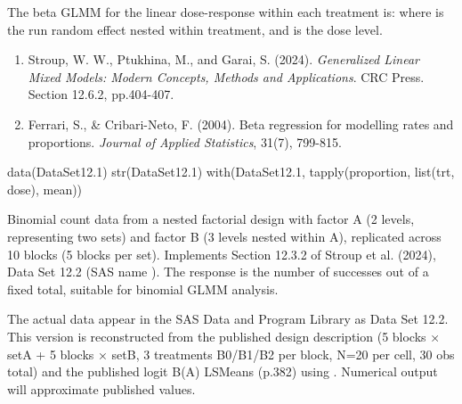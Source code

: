 \documentclass[a4paper]{book}
\begin{document}
%
\begin{Details}
The beta GLMM for the linear dose-response within each treatment is:
where  is the run random
effect nested within treatment, and  is the dose level.
\end{Details}
%
\begin{References}
\begin{enumerate}

\item{} Stroup, W. W., Ptukhina, M., and Garai, S. (2024).
\emph{Generalized Linear Mixed Models: Modern Concepts,
Methods and Applications}. CRC Press. Section 12.6.2, pp.404-407.
\item{} Ferrari, S., \& Cribari-Neto, F. (2004).
Beta regression for modelling rates and proportions.
\emph{Journal of Applied Statistics}, 31(7), 799-815.

\end{enumerate}

\end{References}
%
\begin{SeeAlso}
\end{SeeAlso}
%
\begin{Examples}
\begin{ExampleCode}
data(DataSet12.1)
str(DataSet12.1)
with(DataSet12.1, tapply(proportion, list(trt, dose), mean))
\end{ExampleCode}
\end{Examples}
%
\begin{Description}
Binomial count data from a nested factorial design with factor A (2 levels,
representing two sets) and factor B (3 levels nested within A), replicated
across 10 blocks (5 blocks per set).  Implements Section 12.3.2 of
Stroup et al. (2024), Data Set 12.2 (SAS name ).
The response is the number of successes out of a fixed total, suitable for
binomial GLMM analysis.

 The actual data appear in the SAS Data and
Program Library as Data Set 12.2.  This version is reconstructed from the
published design description (5 blocks × setA + 5 blocks × setB, 3
treatments B0/B1/B2 per block, N=20 per cell, 30 obs total) and the
published logit B(A) LSMeans (p.382) using .
Numerical output will approximate published values.
\end{Description}
\end{document}
